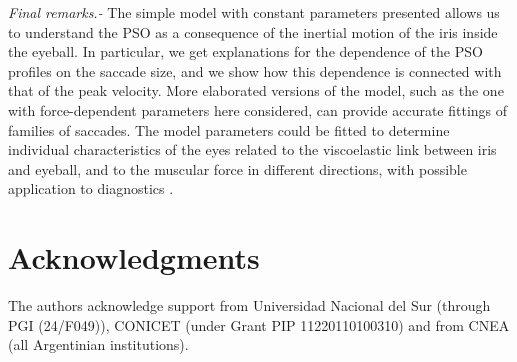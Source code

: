 \documentclass[prl]{revtex4}
\begin{document}
{\em Final remarks.-} 
The simple model with constant parameters presented allows us to understand the PSO as a consequence of the inertial motion of the iris inside the eyeball. In particular, we get explanations for the dependence of the PSO profiles on the saccade size, and we show how this dependence is connected with that of the peak velocity. More elaborated versions of the model, such as the one with 
force-dependent parameters here considered, can provide accurate fittings of families of saccades. The model parameters could be fitted to determine individual characteristics of the eyes related to the viscoelastic link between iris and eyeball, and to the muscular force in different directions, with possible application to diagnostics \cite{aging}. 




\section*{Acknowledgments}
The authors acknowledge support from Universidad Nacional del Sur (through PGI (24/F049)), CONICET (under Grant PIP 11220110100310) and from CNEA (all Argentinian institutions).
\end{document}
